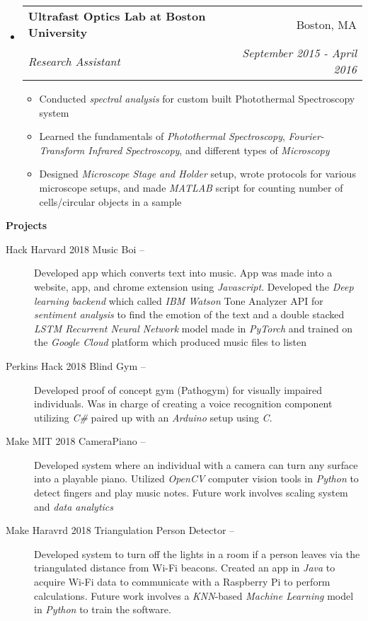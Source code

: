 \documentclass[letterpaper, 8pt]{extarticle}
\makeatletter
\newcommand{\resitem}[1]{\item #1 \vspace{-2pt}}
\newcommand{\resheading}[1]{{\large \colorbox{mygrey}{\begin{minipage}{0.99\textwidth}{\textbf{#1 \vphantom{p\^{E}}}}\end{minipage}}}}
\newcommand{\ressubheading}[4]{
\begin{tabular*}{7.0in}{l@{\extracolsep{\fill}}r}
		\textbf{#1} & #2 \\
		\textit{#3} & \textit{#4} \\
\end{tabular*}\vspace{-6pt}}
\makeatother
\begin{document}
\begin{itemize}
\begin{itemize}
	\end{itemize}
\item
	\ressubheading{Ultrafast Optics Lab at Boston University}{Boston, MA}{Research Assistant}{September 2015 - April 2016}
	\begin{itemize}
	    \resitem{Conducted \emph{spectral analysis} for custom built Photothermal Spectroscopy system}
	    \resitem{Learned the fundamentals of \emph{Photothermal Spectroscopy}, \emph{Fourier-Transform Infrared Spectroscopy}, and different types of \emph{Microscopy} }
	    \resitem{Designed \emph{Microscope Stage and Holder} setup, wrote protocols for various microscope setups, and made \emph{MATLAB} script for counting number of cells/circular objects in a sample}
	\end{itemize}


\end{itemize}



\resheading{Projects}
\begin{description}
\item[Hack Harvard 2018 Music Boi --] Developed app which converts text into music. App was made into a website, app, and chrome extension using \emph{Javascript}. Developed the \emph{Deep learning backend} which called \emph{IBM Watson} Tone Analyzer API for \emph{sentiment analysis} to find the emotion of the text and a double stacked \emph{LSTM Recurrent Neural Network} model made in \emph{PyTorch} and trained on the \emph{Google Cloud} platform which produced music files to listen

\item[Perkins Hack 2018 Blind Gym --]  Developed proof of concept gym (Pathogym) for visually impaired individuals. Was in charge of creating a voice recognition component utilizing \emph{C\#} paired up with an \emph{Arduino} setup using \emph{C}.

\item[Make MIT 2018 CameraPiano --] Developed system where an individual with a camera can turn any surface into a playable piano. Utilized \emph{OpenCV} computer vision tools in \emph{Python} to detect fingers and play music notes. Future work involves scaling system and \emph{data analytics}

\item[Make Haravrd 2018 Triangulation Person Detector --] Developed system to turn off the lights in a room if a person leaves via the triangulated distance from Wi-Fi beacons. Created an app in \emph{Java} to acquire Wi-Fi data to communicate with a Raspberry Pi to perform calculations. Future work involves a \emph{KNN}-based \emph{Machine Learning} model in \emph{Python} to train the software.
\end{description}
\end{document}

